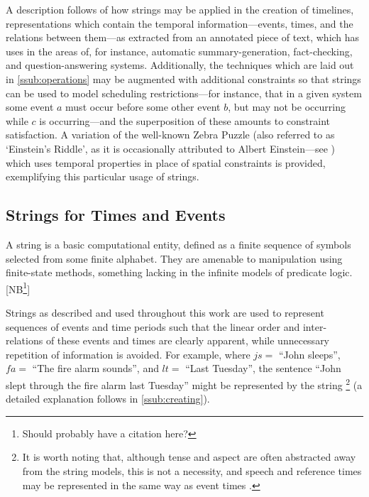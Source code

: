 \documentclass[a4paper,12pt,leqno]{article}
\newcommand{\vph}[1]{\vphantom{#1}}
\newcommand{\ebox}[1]{\fbox{$\vph{'(),}#1$}}
\newcommand{\EventString}[1]{%
	\renewcommand*{\do}[1]{\ebox{##1}}%
	\PipeParser{#1}%
}
\newcommand{\selfnote}[1]{{\color{red}[NB\footnote{{\color{red}#1}}]}}
\newcommand{\nb}{\selfnote}
\begin{document}
A description follows of how strings may be applied in the creation of timelines, representations which contain the temporal information---events, times, and the relations between them---as extracted from an annotated piece of text, which has uses in the areas of, for instance, automatic summary-generation, fact-checking, and question-answering systems. Additionally, the techniques which are laid out in \cref{ssub:operations} may be augmented with additional constraints so that strings can be used to model scheduling restrictions---for instance, that in a given system some event $a$ must occur before some other event $b$, but may not be occurring while $c$ is occurring---and the superposition of these amounts to constraint satisfaction. A variation of the well-known Zebra Puzzle (also referred to as `Einstein's Riddle', as it is occasionally attributed to Albert Einstein---see \citet[p. 10]{stangroom2009einstein}) which uses temporal properties in place of spatial constraints is provided, exemplifying this particular usage of strings.

\subsection{Strings for Times and Events}\label{sub:strings}
A string is a basic computational entity, defined as a finite sequence of symbols selected from some finite alphabet. They are amenable to manipulation using finite-state methods, something lacking in the infinite models of predicate logic. \nb{Should probably have a citation here?}

Strings as described and used throughout this work are used to represent sequences of events and time periods such that the linear order and inter-relations of these events and times are clearly apparent, while unnecessary repetition of information is avoided. For example, where $js =$ ``John sleeps'', $fa =$ ``The fire alarm sounds'', and $lt =$ ``Last Tuesday'', the sentence ``John slept through the fire alarm last Tuesday'' might be represented by the string \EventString{{}|lt|js,lt|fa,js,lt|js,lt|lt|{}}\footnote{It is worth noting that, although tense and aspect are often abstracted away from the string models, this is not a necessity, and speech and reference times may be represented in the same way as event times \citep{fernando2016regular,Derczynski2013,reichenbach1947elements}.} (a detailed explanation follows in \cref{ssub:creating}).
\end{document}
